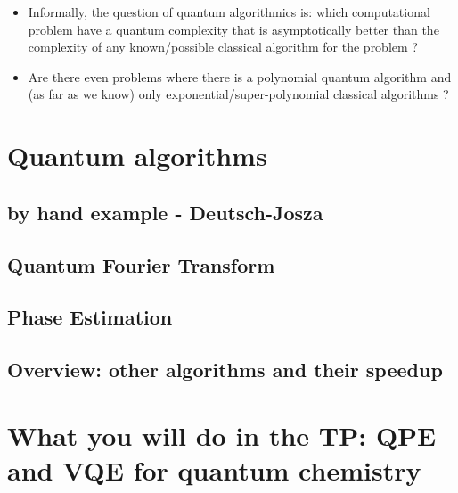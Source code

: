 \documentclass{article}
\begin{document}
\begin{itemize}
\item Informally, the question of quantum algorithmics is: which computational problem
have a quantum complexity that is asymptotically better than the complexity
of any known/possible classical algorithm for the problem ?
\item Are there even problems where there is a polynomial quantum algorithm and (as far as we
know) only exponential/super-polynomial classical algorithms ?
\end{itemize}

\section{Quantum algorithms}

\subsection{by hand example - Deutsch-Josza}

\subsection{Quantum Fourier Transform}

\subsection{Phase Estimation}

\subsection{Overview: other algorithms and their speedup}



\section{What you will do in the TP: QPE and VQE for quantum chemistry}
\end{document}
